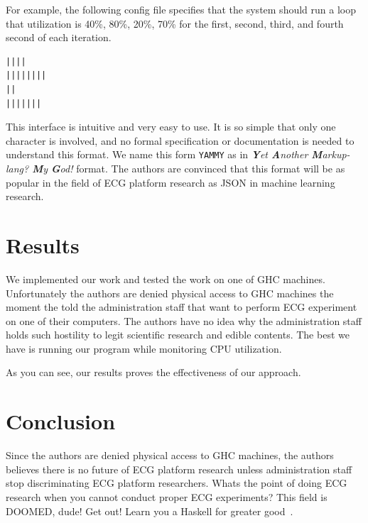 \documentclass[conference]{IEEEtran}
\begin{document}
For example, the following config file specifies that the system should run a loop that utilization is
40\%, 80\%, 20\%, 70\%  for the first, second, third, and fourth second of each iteration.

\begin{verbatim}
||||
||||||||
||
|||||||
\end{verbatim}

This interface is intuitive and very easy to use. It is so simple that only one character is involved, and
no formal specification or documentation is needed to understand this format. We name this form \texttt{YAMMY} as in
\textit{\textbf{Y}et \textbf{A}nother \textbf{M}arkup-lang? \textbf{M}y \textbf{G}od!} format. The authors are 
convinced that this format will be as popular in the field of ECG platform research as JSON in machine learning research.

\section{Results}

We implemented our work and tested the work on one of GHC machines. Unfortunately the authors are denied physical access to
GHC machines the moment the told the administration staff that want to perform ECG experiment on one of their computers. The 
authors have no idea why the administration staff holds such hostility to legit scientific research and edible contents. The 
best we have is running our program while monitoring CPU utilization. 

As you can see, our results proves the effectiveness of our approach.

\section{Conclusion}

Since the authors are denied physical access to GHC machines, the authors believes there is no future of ECG platform research
unless administration staff stop discriminating ECG platform researchers. Whats the point of doing ECG research when you cannot
conduct proper ECG experiments? This field is DOOMED, dude! Get out! Learn you a Haskell for greater good~\cite{harper2016practical}. 


\ifCLASSOPTIONcaptionsoff
  \newpage
\fi


\end{document}
